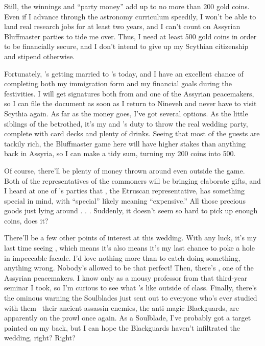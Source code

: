 \documentclass[char]{Kos}
\begin{document}
Still, the winnings and ``party money'' add up to no more than 200 gold coins. Even if I advance through the astronomy curriculum speedily, I won't be able to land real research jobs for at least two years, and I can't count on Assyrian Bluffmaster parties to tide me over. Thus, I need at least 500 gold coins in order to be financially secure, and I don't intend to give up my Scythian citizenship and stipend otherwise.

Fortunately, \cBride{}'s getting married to \cPoet{}'s \cGroom{\sibling} \cGroom{} today, and I have an excellent chance of completing both my immigration form and my financial goals during the festivities. I will get signatures both from \cScythiaKing{} and one of the Assyrian peacemakers, so I can file the document as soon as I return to Nineveh and never have to visit Scythia again. As far as the money goes, I've got several options. As the little siblings of the betrothed, it's my and \cPoet{}'s duty to throw the real wedding party, complete with card decks and plenty of drinks. Seeing that most of the guests are tackily rich, the Bluffmaster game here will have higher stakes than anything back in Assyria, so I can make a tidy sum, turning my 200 coins into 500.

Of course, there'll be plenty of money thrown around even outside the game. Both of the representatives of the commoners will be bringing elaborate gifts, and I heard at one of \cPoet{}'s parties that \cMerchant{}, the Etruscan representative, has something special in mind, with ``special'' likely meaning ``expensive.'' All those precious goods just lying around . . . Suddenly, it doesn't seem so hard to pick up enough coins, does it?

There'll be a few other points of interest at this wedding. With any luck, it's my last time seeing \cBride{}, which means it's also means it's my last chance to poke a hole in \cBride{\their} impeccable facade. I'd love nothing more than to catch \cBride{\them} doing something, anything wrong. Nobody's allowed to be that perfect! Then, there's \cAnarchist{}, one of the Assyrian peacemakers. I know \cAnarchist{} only as a mousy professor from that third-year seminar I took, so I'm curious to see what \cAnarchist{\they}'s like outside of class. Finally, there's the ominous warning the Soulblades just sent out to everyone who's ever studied with them-- their ancient assassin enemies, the anti-magic Blackguards, are apparently on the prowl once again. As a Soulblade, I've probably got a target painted on my back, but I can hope the Blackguards haven't infiltrated the wedding, right? Right?
\end{document}
